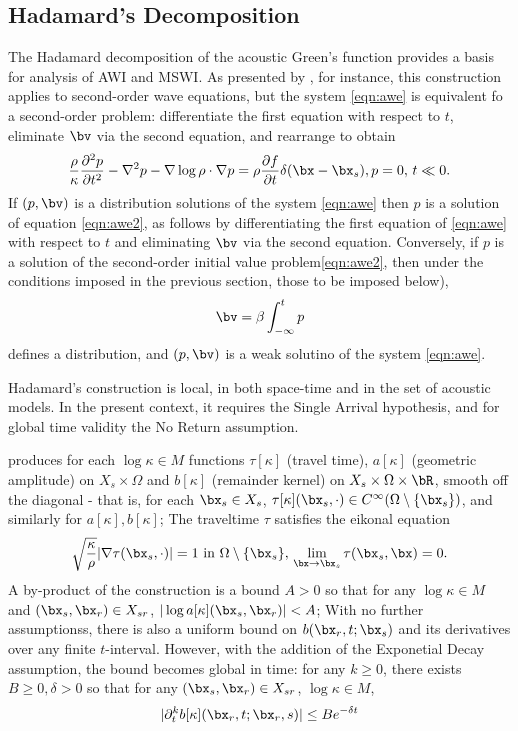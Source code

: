 \subsection{Hadamard's Decomposition}
The Hadamard decomposition of the acoustic Green's function \cite[]{Friedlander:75,Qian:JCP24} provides a
basis for analysis of AWI and MSWI. As presented by
\cite{Friedlander:75}, for instance, this construction applies to
second-order wave equations, but the system \ref{eqn:awe} is
equivalent fo a second-order problem: differentiate the first equation
with respect to $t$, eliminate $\bv$ via the second equation, and
rearrange to obtain
\begin{equation}
  \label{eqn:awe2}
  \frac{\rho}{\kappa}\frac{\partial^2 p}{\partial t^2} - \nabla^2 p -
  \nabla \log \rho \cdot \nabla p = \rho \frac{\partial f}{\partial t}
  \delta(\bx-\bx_s), \nonumber \\
  p=0, \, t \ll 0.
\end{equation}
If $(p,\bv)$ is a distribution solutions of the system
\ref{eqn:awe} then $p$ is a solution of equation
\ref{eqn:awe2}, as follows by differentiating the first equation of
\ref{eqn:awe} with respect to $t$ and eliminating $\bv$ via the second
equation. Conversely, if $p$ is a solution of the second-order initial
value problem\ref{eqn:awe2}, then under the conditions imposed in the
previous section, those to be imposed below),
\[
  \bv = \beta \int_{-\infty}^t p
\]
defines a distribution, and $(p,\bv)$ is a weak solutino of the system \ref{eqn:awe}.

Hadamard's construction is local, in both space-time and in the set of
acoustic models. In the present context, it requires the Single
Arrival hypothesis, and for global time validity the No Return
assumption. 

\cite{Friedlander:75} produces for each $\log \kappa \in M$ functions $\tau[\kappa]$ (travel time), $a[\kappa]$
(geometric amplitude) on $X_s \times \Omega$ and $b[\kappa]$
(remainder kernel) on $X_s \times \Omega \times \bR$, smooth off the
diagonal - that is, for each $\bx_s \in X_s$, $\tau[\kappa](\bx_s,\cdot) \in C^{\infty}(\Omega \setminus
  \{\bx_s\})$, and similarly for $a[\kappa],b[\kappa]$; The traveltime $\tau$
  satisfies the eikonal equation
  \[
    \sqrt{\frac{\kappa}{\rho}} |\nabla \tau(\bx_s,\cdot)| = 1 \mbox{ in } \Omega \setminus
    \{\bx_s\}, \, \lim_{\bx \rightarrow \bx_s} \tau(\bx_s,\bx) = 0.
  \]
A by-product of the construction is a bound $A>0$ so that for any $\log \kappa \in M$
  and $(\bx_s,\bx_r) \in X_{sr}$,  $|\log a[\kappa](\bx_s,\bx_r)| <
  A$;  With no further assumptionss, there is also a uniform bound on $b(\bx_r,t;\bx_s)$ and
  its derivatives over any finite $t$-interval. However, with the
  addition of the Exponetial Decay assumption, the bound becomes
  global in time: for any $k \ge 0$, there exists $B \ge 0,\delta > 0$ so
  that for any $(\bx_s,\bx_r) \in X_{sr}$, $\log \kappa \in M$, 
\begin{equation}
  |\partial^k_t b[\kappa](\bx_r,t;\bx_r,s)| \le B e^{-\delta t}
  \label{eqn:best}
\end{equation}

